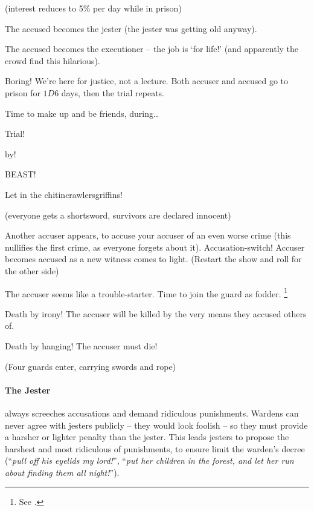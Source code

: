 \begin{multicols}{2}
\begin{dlist}
  (interest reduces to 5\% per day while in prison)
  \item
  The accused becomes the jester (the jester was getting old anyway).
  \item
  The accused becomes the executioner -- the job is `for life!' (and apparently the crowd find this hilarious).
  \item
  Boring!
  We're here for justice, not a lecture.
  Both accuser and accused go to prison for $1D6$ days, then the trial repeats.
  \item
  Time to make up and be friends, during\ldots

  Trial!

  by!

  BEAST!

  Let in the \ifodd\value{r4} chitincrawlers\else griffins\fi!

  (everyone gets a shortsword, survivors are declared innocent)
  \item
  \ifodd\value{r3}
    Another accuser appears, to accuse your accuser of an even worse crime (this nullifies the first crime, as everyone forgets about it).
  \else
    Accusation-switch!
    Accuser becomes accused as a new witness comes to light.
    (Restart the show and roll for the other side)
  \fi
  \item
  The accuser seems like a trouble-starter.
  Time to join the \gls{guard} as fodder.%
  \footnote{See .}
  \item
  Death by irony!
  The accuser will be killed by the very means they accused others of.
  \item
  Death by hanging!
  The accuser must die!

  (Four guards enter, carrying swords and rope)
\end{dlist}

\paragraph[the Jester]{The Jester}
\label{guildJester}%
always screeches accusations and demand ridiculous punishments.
Wardens can never agree with jesters publicly -- they would look foolish -- so they must provide a harsher or lighter penalty than the jester.
This leads jesters to propose the harshest and most ridiculous of punishments, to ensure limit the warden's decree (``\emph{pull off his eyelids my lord!}'', ``\emph{put her children in the forest, and let her run about finding them all night!}'').


\end{multicols}
